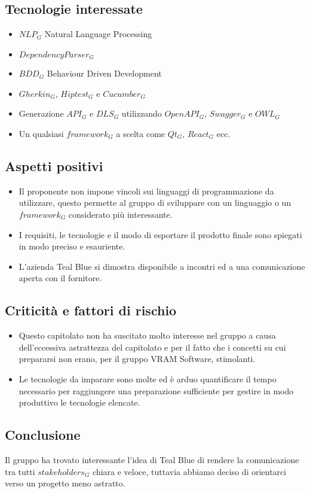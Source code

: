 \subsection{Tecnologie interessate}
\begin{itemize}
	\item $NLP_G$ Natural Language Processing
	\item $Dependency Parser_G$
	\item $BDD_G$ Behaviour Driven Development
	\item $Gherkin_G$, $Hiptest_G$ e $Cucumber_G$
	\item Generazione $API_G$ e $DLS_G$ utilizzando $OpenAPI_G$, $Swagger_G$ e $OWL_G$
	\item Un qualsiasi $framework_G$ a scelta come $Qt_G$, $React_G$ ecc.
\end{itemize} 
\subsection{Aspetti positivi}
\begin{itemize} 
	\item Il proponente non impone vincoli sui linguaggi di programmazione da utilizzare, questo permette  al gruppo di sviluppare con un linguaggio o un $framework_G$ considerato più interessante. 
	\item I requisiti, le tecnologie e il modo di esportare il prodotto finale sono spiegati in modo preciso e esauriente.
	\item L'azienda Teal Blue si dimostra disponibile a incontri ed a una comunicazione aperta con il fornitore.
\end{itemize}
\subsection{Criticità e fattori di rischio}
\begin{itemize}
	\item Questo capitolato non ha suscitato molto interesse nel gruppo a causa dell'eccessiva astrattezza del capitolato e per il fatto che i concetti su cui prepararsi non erano, per il gruppo VRAM Software, stimolanti. 
	\item Le tecnologie da imparare sono molte ed è arduo quantificare il tempo necessario per raggiungere una preparazione sufficiente per gestire in modo produttivo le tecnologie elencate.
\end{itemize}
\subsection{Conclusione}
Il gruppo ha trovato interessante l'idea di Teal Blue di rendere la comunicazione tra tutti $stakeholders_G$ chiara e veloce, tuttavia abbiamo deciso di orientarci verso un progetto meno astratto.